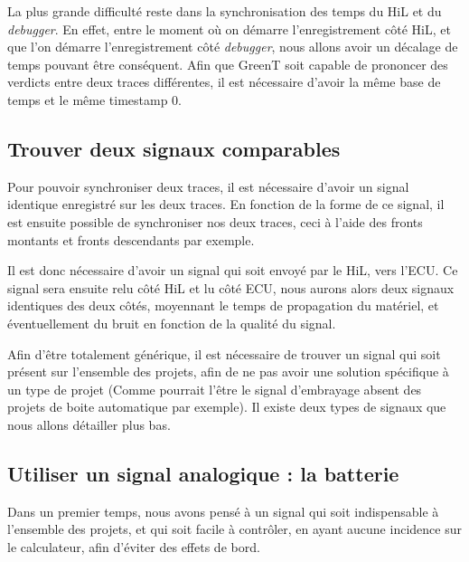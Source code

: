 La plus grande difficulté reste dans la synchronisation des temps du HiL et du \textit{debugger}. En effet, entre le moment où on démarre l'enregistrement côté HiL, et que l'on démarre l'enregistrement côté \textit{debugger}, nous allons avoir un décalage de temps pouvant être conséquent. Afin que GreenT soit capable de prononcer des verdicts entre deux traces différentes, il est nécessaire d'avoir la même base de temps et le même timestamp 0. 

\subsection{Trouver deux signaux comparables}
Pour pouvoir synchroniser deux traces, il est nécessaire d'avoir un signal identique enregistré sur les deux traces. En fonction de la forme de ce signal, il est ensuite possible de synchroniser nos deux traces, ceci à l'aide des fronts montants et fronts descendants par exemple. 

Il est donc nécessaire d'avoir un signal qui soit envoyé par le HiL, vers l'ECU. Ce signal sera ensuite relu côté HiL et lu côté ECU, nous aurons alors deux signaux identiques des deux côtés, moyennant le temps de propagation du matériel, et éventuellement du bruit en fonction de la qualité du signal. 

Afin d'être totalement générique, il est nécessaire de trouver un signal qui soit présent sur l'ensemble des projets, afin de ne pas avoir une solution spécifique à un type de projet (Comme pourrait l'être le signal d'embrayage absent des projets de boite automatique par exemple). Il existe deux types de signaux que nous allons détailler plus bas. 


\subsection{Utiliser un signal analogique : la batterie}
Dans un premier temps, nous avons pensé à un signal qui soit indispensable à l'ensemble des projets, et qui soit facile à contrôler, en ayant aucune incidence sur le calculateur, afin d'éviter des effets de bord. 

